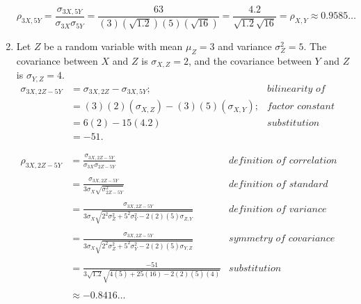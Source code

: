 \documentclass[12pt]{article}
\begin{document}
\begin{enumerate}
\[\rho_{3X,5Y}=\frac{\sigma_{3X,5Y}}{\sigma_{3X}\sigma_{5Y}}=\frac{63}{(3)(\sqrt{1.2})(5)(\sqrt{16})}=\frac{4.2}{\sqrt{1.2}\sqrt{16}}=\rho_{X,Y}\approx 0.9585\dots\]
\item Let $Z$ be a random variable with mean $\mu_Z=3$ and variance $\sigma^2_Z=5$. The covariance between $X$ and $Z$ is $\sigma_{X,Z}=2$, and the covariance between $Y$ and $Z$ is $\sigma_{Y,Z}=4$.
\begin{align*}
\sigma_{3X,2Z-5Y}
&=\sigma_{3X,2Z}-\sigma_{3X,5Y};&\textit{bilinearity of covariance}\\
&=(3)(2)(\sigma_{X,Z})-(3)(5)(\sigma_{X,Y});&\textit{factor constant coefficient}\\
&=6(2)-15(4.2)&\textit{substitution}\\
&=-51.
\end{align*}

\begin{align*}
\rho_{3X,2Z-5Y}
&=\frac{\sigma_{3X,2Z-5Y}}{\sigma_{3X}\sigma_{2Z-5Y}}&\textit{definition of correlation}\\\\
&=\frac{\sigma_{3X,2Z-5Y}}{3\sigma_{X}\sqrt{\sigma^2_{2Z-5Y}}}&\textit{definition of standard deviation}\\\\
&=\frac{\sigma_{3X,2Z-5Y}}{3\sigma_{X}\sqrt{2^2\sigma^2_Z+5^2\sigma^2_Y-2(2)(5)\sigma_{Z,Y}}}&\textit{definition of variance}\\\\
&=\frac{\sigma_{3X,2Z-5Y}}{3\sigma_{X}\sqrt{2^2\sigma^2_Z+5^2\sigma^2_Y-2(2)(5)\sigma_{Y,Z}}}&\textit{symmetry of covariance}\\\\
&=\frac{-51}{3\sqrt{1.2}\sqrt{4(5)+25(16)-2(2)(5)(4)}}&\textit{substitution}\\\\
&\approx -0.8416\dots
\end{align*}
\end{enumerate}
\end{document}
